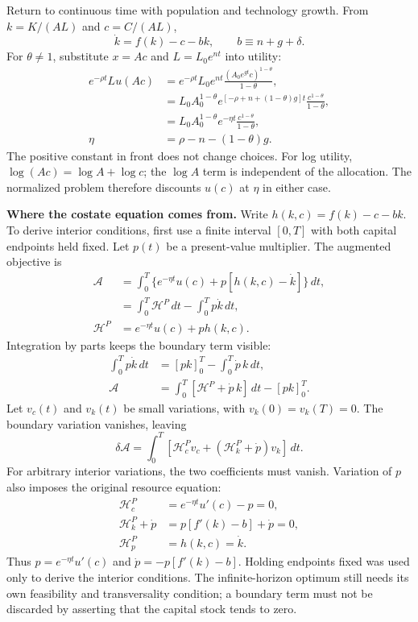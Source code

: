 Return to continuous time with population and technology growth. From
$k=K/(AL)$ and $c=C/(AL)$,
\begin{equation}\label{eq:ramsey-capital-motion}
\dot k=f(k)-c-bk,\qquad b\equiv n+g+\delta.
\end{equation}
For $\theta\ne1$, substitute $x=Ac$ and $L=L_0e^{nt}$ into utility:
\begin{align}
e^{-\rho t}Lu(Ac)
 &=e^{-\rho t}L_0e^{nt}\frac{(A_0e^{gt}c)^{1-\theta}}{1-\theta},\\
 &=L_0A_0^{1-\theta}e^{[-\rho+n+(1-\theta)g]t}
       \frac{c^{1-\theta}}{1-\theta},\\
 &=L_0A_0^{1-\theta}e^{-\eta t}\frac{c^{1-\theta}}{1-\theta},\\
\eta&=\rho-n-(1-\theta)g.
\end{align}
The positive constant in front does not change choices. For log utility,
$\log(Ac)=\log A+\log c$; the $\log A$ term is independent of the allocation.
The normalized problem therefore discounts $u(c)$ at $\eta$ in either case.

\textbf{Where the costate equation comes from.}
Write $h(k,c)=f(k)-c-bk$. To derive interior conditions, first use a finite
interval $[0,T]$ with both capital endpoints held fixed. Let $p(t)$ be a
present-value multiplier. The augmented objective is
\begin{align}
\mathscr A
 &=\int_0^T\{e^{-\eta t}u(c)+p[h(k,c)-\dot k]\}\,dt,\\
 &=\int_0^T\mathcal H^P\,dt-\int_0^Tp\dot k\,dt,\\
\mathcal H^P&=e^{-\eta t}u(c)+ph(k,c).
\end{align}
Integration by parts keeps the boundary term visible:
\begin{align}
\int_0^Tp\dot k\,dt
 &=[pk]_0^T-\int_0^T\dot p\,k\,dt,\\
\mathscr A
 &=\int_0^T[\mathcal H^P+\dot p\,k]\,dt-[pk]_0^T.
\end{align}
Let $v_c(t)$ and $v_k(t)$ be small variations, with
$v_k(0)=v_k(T)=0$. The boundary variation vanishes, leaving
\[
\delta\mathscr A=\int_0^T
 [\mathcal H^P_c v_c+(\mathcal H^P_k+\dot p)v_k]\,dt.
\]
For arbitrary interior variations, the two coefficients must vanish.
Variation of $p$ also imposes the original resource equation:
\begin{align}
\mathcal H^P_c&=e^{-\eta t}u'(c)-p=0,\\
\mathcal H^P_k+\dot p&=p[f'(k)-b]+\dot p=0,\\
\mathcal H^P_p&=h(k,c)=\dot k.
\end{align}
Thus $p=e^{-\eta t}u'(c)$ and $\dot p=-p[f'(k)-b]$.
Holding endpoints fixed was used only to derive the interior conditions.
The infinite-horizon optimum still needs its own feasibility and
transversality condition; a boundary term must not be discarded by asserting
that the capital stock tends to zero.

